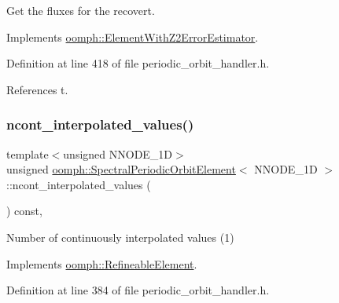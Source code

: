 Get the fluxes for the recovert. 



Implements \hyperlink{classoomph_1_1ElementWithZ2ErrorEstimator_a5688ff5f546d81771cabad82ca5a7556}{oomph\+::\+Element\+With\+Z2\+Error\+Estimator}.



Definition at line 418 of file periodic\+\_\+orbit\+\_\+handler.\+h.



References t.

\mbox{\label{classoomph_1_1SpectralPeriodicOrbitElement_a7a1e61b3aa06a7402448215c6b99dcc3}} 
\subsubsection{\texorpdfstring{ncont\+\_\+interpolated\+\_\+values()}{ncont\_interpolated\_values()}}
{\footnotesize\ttfamily template$<$unsigned N\+N\+O\+D\+E\+\_\+1D$>$ \\
unsigned \hyperlink{classoomph_1_1SpectralPeriodicOrbitElement}{oomph\+::\+Spectral\+Periodic\+Orbit\+Element}$<$ N\+N\+O\+D\+E\+\_\+1D $>$\+::ncont\+\_\+interpolated\+\_\+values (\begin{DoxyParamCaption}{ }\end{DoxyParamCaption}) const\hspace{0.3cm}{\ttfamily [inline]}, {\ttfamily [virtual]}}



Number of continuously interpolated values (1) 



Implements \hyperlink{classoomph_1_1RefineableElement_a53e171a18c9f43f1db90a6876516a073}{oomph\+::\+Refineable\+Element}.



Definition at line 384 of file periodic\+\_\+orbit\+\_\+handler.\+h.

\mbox{\label{classoomph_1_1SpectralPeriodicOrbitElement_a38c80629b1befeb65014659c7e14ab09}} 
